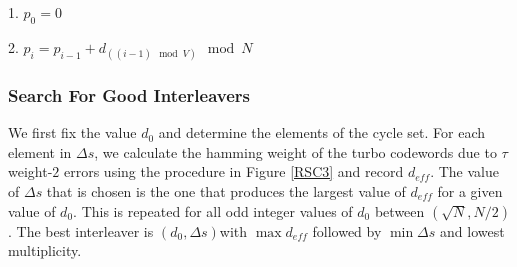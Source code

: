 \documentclass[twoside]{jarticle}
\begin{document}
   1. $p_0=0$
   
   2. $p_i=p_{i-1}+d_{((i-1) \mod V) } \mod N$
   \vspace{-8mm}
\subsubsection{Search For Good Interleavers}
\vspace{-2mm}
 We first fix the value $d_0$ and determine the elements of the cycle set. For each element in $\Delta s$, we calculate the hamming weight of the 
 turbo codewords due to $\tau$ weight-$2$ errors using the procedure in Figure \ref{RSC3} and record $d_{eff}$.  The value of 
 $\Delta s$ that is chosen is the one that produces the largest value of $d_{eff}$
 for a given value of $d_0$. This is repeated for all odd integer values of $d_0$
  between $(\sqrt{N},N/2)$. The best interleaver is $(d_0, \Delta s)$with  $\max{d_{eff}}$ followed by $\min{\Delta s}$ and lowest multiplicity.
  \vspace{-4mm}
\end{document}
